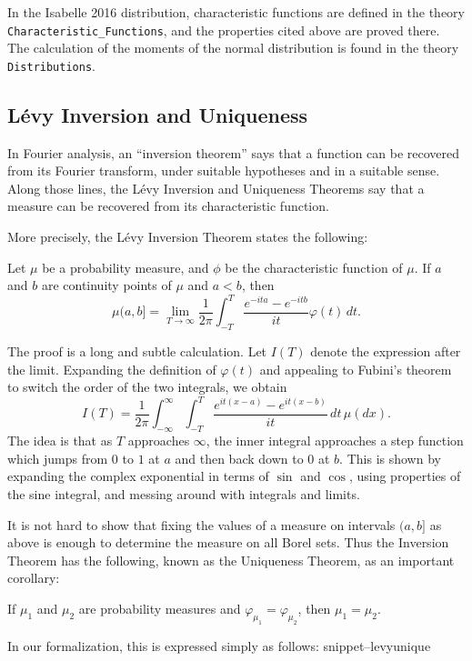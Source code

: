 \documentclass{svjour3}
\newcommand{\ph}{\varphi}
\newcommand{\Snippet}[1]{\csname snippet--#1\endcsname}
\begin{document}
In the Isabelle 2016 distribution, characteristic functions are defined in the theory \verb=Characteristic_Functions=, and the properties cited above are proved there. The calculation of the moments of the normal distribution is found in the theory \verb=Distributions=.

\subsection{L\'evy Inversion and Uniqueness}

In Fourier analysis, an ``inversion theorem'' says that a function can be recovered from its Fourier transform, under suitable hypotheses and in a suitable sense. Along those lines, the L\'evy Inversion and Uniqueness Theorems say that a measure can be recovered from its characteristic function. 

More precisely, the L\'evy Inversion Theorem states the following:
\begin{theorem}
Let $\mu$ be a probability measure, and $\phi$ be the characteristic function of $\mu$. If $a$ and $b$ are continuity points of $\mu$ and $a < b$, then
\[ 
\mu (a,b] = \lim_{T \rightarrow \infty} \frac{1}{2\pi} \int_{-T}^T \frac{e^{-ita} - e^{-itb}}{it} \ph(t) \, dt. 
\]
\end{theorem}

The proof is a long and subtle calculation. Let $I(T)$ denote the expression after the limit. Expanding the definition of $\ph(t)$ and appealing to Fubini's theorem to switch the order of the two integrals, we obtain
\[
I(T) = \frac{1}{2\pi} \int_{-\infty}^\infty \int_{-T}^T \frac{e^{it(x-a)} - e^{it(x-b)}}{it} \, dt \, \mu(dx). 
\]
The idea is that as $T$ approaches $\infty$, the inner integral approaches a step function which jumps from $0$ to $1$ at $a$ and then back down to $0$ at $b$. This is shown by expanding the complex exponential in terms of $\sin$ and $\cos$, using properties of the sine integral, and messing around with integrals and limits.

It is not hard to show that fixing the values of a measure on intervals $(a, b]$ as above is enough to determine the measure on all Borel sets. Thus the Inversion Theorem has the following, known as the Uniqueness Theorem, as an important corollary:
\begin{theorem}
If $\mu_1$ and $\mu_2$ are probability measures and $\ph_{\mu_1} = \ph_{\mu_2}$, then $\mu_1 = \mu_2$. 
\end{theorem}
In our formalization, this is expressed simply as follows:
\Snippet{levyunique}
\end{document}
